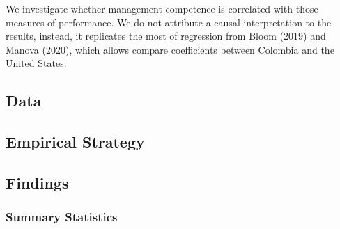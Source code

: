 \documentclass{article}
\begin{document}
We investigate whether management competence is correlated with those measures of performance. We do not attribute a causal interpretation to the results, instead, it replicates the most of regression from Bloom (2019) and Manova (2020), which allows compare coefficients between Colombia and the United States.

\subsection{Data}

\subsection{Empirical Strategy}

\subsection{Findings}


\subsubsection{Summary Statistics}
\end{document}
